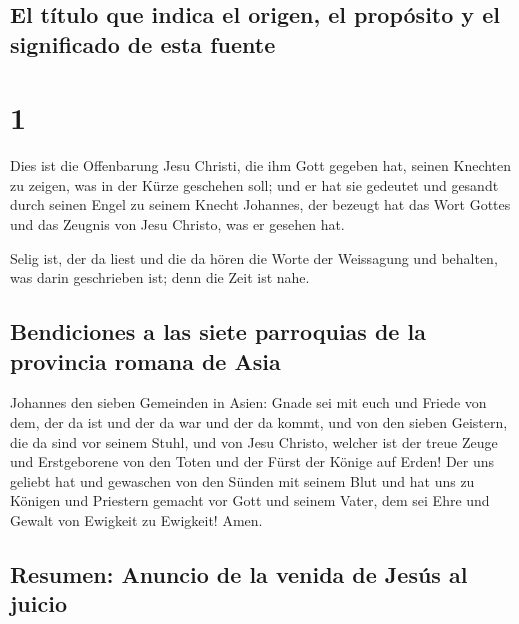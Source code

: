 \hypertarget{el-tuxedtulo-que-indica-el-origen-el-propuxf3sito-y-el-significado-de-esta-fuente}{%
\subsection{El título que indica el origen, el propósito y el
significado de esta
fuente}\label{el-tuxedtulo-que-indica-el-origen-el-propuxf3sito-y-el-significado-de-esta-fuente}}

\hypertarget{section}{%
\section{1}\label{section}}

 Dies ist die Offenbarung Jesu Christi, die ihm Gott
gegeben hat, seinen Knechten zu zeigen, was in der Kürze geschehen soll;
und er hat sie gedeutet und gesandt durch seinen Engel zu seinem Knecht
Johannes,  der bezeugt hat das Wort Gottes und das Zeugnis
von Jesu Christo, was er gesehen hat.

 Selig ist, der da liest und die da hören die Worte der
Weissagung und behalten, was darin geschrieben ist; denn die Zeit ist
nahe.

\hypertarget{bendiciones-a-las-siete-parroquias-de-la-provincia-romana-de-asia}{%
\subsection{Bendiciones a las siete parroquias de la provincia romana de
Asia}\label{bendiciones-a-las-siete-parroquias-de-la-provincia-romana-de-asia}}

 Johannes den sieben Gemeinden in Asien: Gnade sei mit
euch und Friede von dem, der da ist und der da war und der da kommt, und
von den sieben Geistern, die da sind vor seinem Stuhl, 
und von Jesu Christo, welcher ist der treue Zeuge und Erstgeborene von
den Toten und der Fürst der Könige auf Erden! Der uns geliebt hat und
gewaschen von den Sünden mit seinem Blut  und hat uns zu
Königen und Priestern gemacht vor Gott und seinem Vater, dem sei Ehre
und Gewalt von Ewigkeit zu Ewigkeit! Amen.

\hypertarget{resumen-anuncio-de-la-venida-de-jesuxfas-al-juicio}{%
\subsection{Resumen: Anuncio de la venida de Jesús al
juicio}\label{resumen-anuncio-de-la-venida-de-jesuxfas-al-juicio}}

